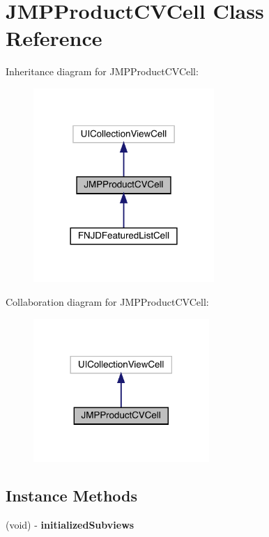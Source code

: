 \hypertarget{interface_j_m_p_product_c_v_cell}{}\section{J\+M\+P\+Product\+C\+V\+Cell Class Reference}
\label{interface_j_m_p_product_c_v_cell}


Inheritance diagram for J\+M\+P\+Product\+C\+V\+Cell\+:\nopagebreak
\begin{figure}[H]
\begin{center}
\leavevmode
\includegraphics[width=194pt]{interface_j_m_p_product_c_v_cell__inherit__graph}
\end{center}
\end{figure}


Collaboration diagram for J\+M\+P\+Product\+C\+V\+Cell\+:\nopagebreak
\begin{figure}[H]
\begin{center}
\leavevmode
\includegraphics[width=189pt]{interface_j_m_p_product_c_v_cell__coll__graph}
\end{center}
\end{figure}
\subsection*{Instance Methods}
\begin{DoxyCompactItemize}
\item 
\mbox{\label{interface_j_m_p_product_c_v_cell_a50fe0cc2a2c0662d8bb2534d10d4f11d}} 
(void) -\/ {\bfseries initialized\+Subviews}
\end{DoxyCompactItemize}
